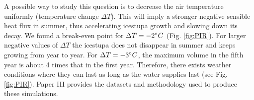 A possible way to study this question is to decrease the air temperature uniformly (temperature change $\Delta
T$). This will imply a stronger negative sensible heat flux in summer, thus accelerating icestupa growth and
slowing down its decay. We found a break-even point for $\Delta T = -2 ^{\circ} C$ (Fig. \ref{fig:PIR}). For
larger negative values of $\Delta T$ the icestupa does not disappear in summer and keeps growing from year to
year. For $\Delta T = -3 ^{\circ} C$, the maximum volume in the fifth year is about 4 times that in the first
year. Therefore, there exists weather conditions where they can last as long as the water supplies last (see
Fig. \ref{fig:PIR}). Paper III provides the datasets and methodology used to produce these simulations.










